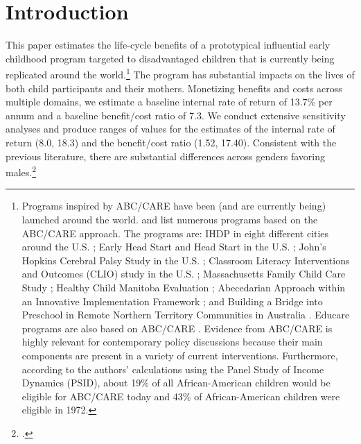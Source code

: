 \section{Introduction}

This paper estimates the life-cycle benefits of a prototypical influential early childhood program targeted to disadvantaged children that is currently being replicated around the world.\footnote{Programs inspired by ABC/CARE have been (and are currently being) launched around the world. \citet{Sparling_2010_Highlights} and \citet{Ramey_Ramey_Lanzi_2014_Interventions} list numerous programs based on the ABC/CARE approach. The programs are: IHDP in eight different cities around the U.S. \citep{Spiker-etal_1997_Helping}; Early Head Start and Head Start in the U.S. \citep{Schneider_McDonald-eds_2007_Scale-Up_Vol-1}; John's Hopkins Cerebral Palsy Study in the U.S. \citep{Sparling_2010_Highlights}; Classroom Literacy Interventions and Outcomes (CLIO) study in the U.S. \citep{Sparling_2010_Highlights}; Massachusetts Family Child Care Study \citep{Collins_etal_2010_Massachusetts-Study}; Healthy Child Manitoba Evaluation \citep{Healthy_Child_Manitoba_2015_Starting-Early}; Abecedarian Approach within an Innovative Implementation Framework \citep{Jensen_Nielsen_2016_ABC-Programme-Pilot}; and Building a Bridge into Preschool in Remote Northern Territory Communities in Australia \citep{UMonash_Dataset_2015_URL}. Educare programs are also based on ABC/CARE \citep{Educare_2014_Research_Agenda,Yazejian_Bryant_2012_Educare}. Evidence from ABC/CARE is highly relevant for contemporary policy discussions because their main components are present in a variety of current interventions. Furthermore, according to the authors' calculations using the Panel Study of Income Dynamics (PSID), about 19\% of all African-American children would be eligible for ABC/CARE today and 43\% of African-American children were eligible in 1972.} The program has substantial impacts on the lives of both child participants and their mothers. Monetizing benefits and costs across multiple domains, we estimate a baseline internal rate of return of 13.7\% per annum and a baseline benefit/cost ratio of 7.3. We conduct extensive sensitivity analyses and produce ranges of values for the estimates of the internal rate of return (8.0, 18.3) and the benefit/cost ratio (1.52, 17.40). Consistent with the previous literature, there are substantial differences across genders favoring males.\footnote{\cite{Garcia_Heckman_Ziff_2017_Gender-Diff_UNPUBLISHED}.}

